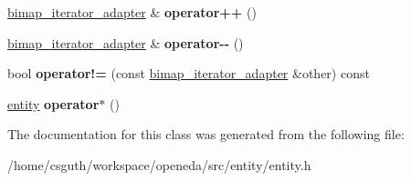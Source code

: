 \begin{DoxyCompactItemize}
\item 
\hypertarget{classophidian_1_1entity_1_1bimap__iterator__adapter_ad2f6988fb85d91b70c556a5ac998d8f9}{\hyperlink{classophidian_1_1entity_1_1bimap__iterator__adapter}{bimap\-\_\-iterator\-\_\-adapter} \& {\bfseries operator++} ()}\label{classophidian_1_1entity_1_1bimap__iterator__adapter_ad2f6988fb85d91b70c556a5ac998d8f9}

\item 
\hypertarget{classophidian_1_1entity_1_1bimap__iterator__adapter_a6bea340b5e727d50f4bb4c0465673963}{\hyperlink{classophidian_1_1entity_1_1bimap__iterator__adapter}{bimap\-\_\-iterator\-\_\-adapter} \& {\bfseries operator-\/-\/} ()}\label{classophidian_1_1entity_1_1bimap__iterator__adapter_a6bea340b5e727d50f4bb4c0465673963}

\item 
\hypertarget{classophidian_1_1entity_1_1bimap__iterator__adapter_a274d3c72507df6249ee6caee9a8d3f65}{bool {\bfseries operator!=} (const \hyperlink{classophidian_1_1entity_1_1bimap__iterator__adapter}{bimap\-\_\-iterator\-\_\-adapter} \&other) const }\label{classophidian_1_1entity_1_1bimap__iterator__adapter_a274d3c72507df6249ee6caee9a8d3f65}

\item 
\hypertarget{classophidian_1_1entity_1_1bimap__iterator__adapter_a9057916c4a7131db57ddc280a3827875}{\hyperlink{classophidian_1_1entity_1_1entity}{entity} {\bfseries operator$\ast$} ()}\label{classophidian_1_1entity_1_1bimap__iterator__adapter_a9057916c4a7131db57ddc280a3827875}

\end{DoxyCompactItemize}


The documentation for this class was generated from the following file\-:\begin{DoxyCompactItemize}
\item 
/home/csguth/workspace/openeda/src/entity/entity.\-h\end{DoxyCompactItemize}
